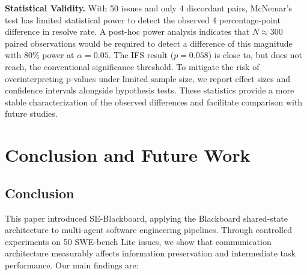 \documentclass{ieeeaccess}
\begin{document}
\textbf{Statistical Validity.} With 50 issues and only 4 discordant pairs, McNemar's test has limited statistical power to detect the observed 4 percentage-point difference in resolve rate. A post-hoc power analysis indicates that $N \approx 300$ paired observations would be required to detect a difference of this magnitude with 80\% power at $\alpha = 0.05$. The IFS result ($p = 0.058$) is close to, but does not reach, the conventional significance threshold. To mitigate the risk of overinterpreting p-values under limited sample size, we report effect sizes and confidence intervals alongside hypothesis tests. These statistics provide a more stable characterization of the observed differences and facilitate comparison with future studies.

\section{Conclusion and Future Work}

\subsection{Conclusion}

This paper introduced SE-Blackboard, applying the Blackboard shared-state architecture to multi-agent software engineering pipelines. Through controlled experiments on 50 SWE-bench Lite issues, we show that communication architecture measurably affects information preservation and intermediate task performance. Our main findings are:
\end{document}
